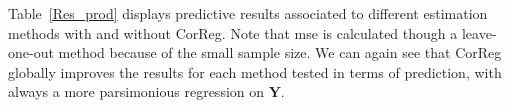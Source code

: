 \documentclass[12pt,a4paper]{report}
\begin{document}
		
		
%  		
  			



Table~\ref{Res_prod} displays predictive results associated to different estimation methods with and without {\sc CorReg}. Note that {\sc mse} is calculated though a leave-one-out method because of the small sample size. We can again see that {\sc CorReg} globally improves the results for each method tested in terms of prediction, with always a more parsimonious regression on $\boldsymbol{Y}$.
		
\end{document}
